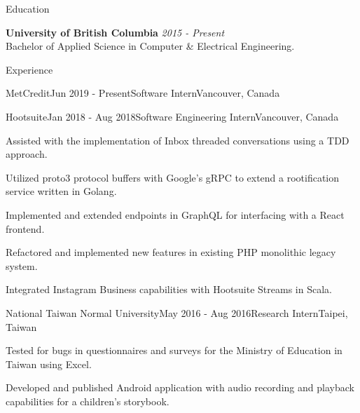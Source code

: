 \documentclass{resume} %
\begin{document}

\begin{rSection}{Education}

{\bf University of British Columbia} \hfill {\em 2015 - Present} \\ 
Bachelor of Applied Science in Computer \& Electrical Engineering.

\end{rSection}
\begin{rSection}{Experience}

\begin{rSubsection}{MetCredit}{Jun 2019 - Present}{Software Intern}{Vancouver, Canada}
\end{rSubsection}

  \begin{rSubsection}{Hootsuite}{Jan 2018 - Aug 2018}{Software Engineering Intern}{Vancouver, Canada}
\item Assisted with the implementation of Inbox threaded conversations using a TDD approach.
\item Utilized proto3 protocol buffers with Google's gRPC to extend a rootification service written in Golang.
\item Implemented and extended endpoints in GraphQL for interfacing with a React frontend.
\item Refactored and implemented new features in existing PHP monolithic legacy system.
\item Integrated Instagram Business capabilities with Hootsuite Streams in Scala.  
\end{rSubsection}
\begin{rSubsection}{National Taiwan Normal University}{May 2016 - Aug 2016}{Research Intern}{Taipei, Taiwan}
\item Tested for bugs in questionnaires and surveys for the Ministry of Education in Taiwan using Excel.
\item Developed and published Android application with audio recording and playback capabilities for a children's storybook.
\end{rSubsection}

\end{rSection}
\end{document}

